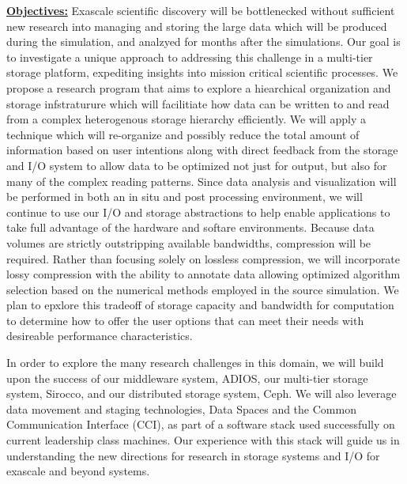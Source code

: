 \documentclass[11pt,letterpaper]{article}
\begin{document}
\underline{\textbf{Objectives:}} Exascale scientific discovery will
be bottlenecked 
without sufficient new research into managing and storing the large data which will be
produced during the simulation, and analzyed for months after the simulations.
Our goal is to investigate a unique approach to addressing this challenge in
a multi-tier storage platform, expediting insights into mission critical
scientific processes. 
%
We propose a research program that aims to explore a hiearchical
organization and storage infstraturure which will facilitiate how data can
be written to and read from a complex heterogenous storage hierarchy
efficiently.  
%
We will apply a technique which will re-organize and possibly
reduce the total amount of information based on user intentions along with
direct feedback from the storage and I/O system to allow data to be
optimized not just for output, but also for many of the complex reading
patterns. Since data analysis and visualization will be performed in both an
in situ and post processing environment, we will continue to use our I/O and
storage abstractions to help enable applications to take full advantage of
the hardware and softare environments. Because data volumes are strictly
outstripping available bandwidths, compression will be required. Rather than
focusing solely on lossless compression, we will incorporate lossy
compression with the ability to annotate data allowing optimized algorithm
selection based on the numerical methods employed in the source
simulation. We plan to epxlore this tradeoff of storage capacity and
bandwidth for computation to determine how to offer the user options that
can meet their needs with desireable performance characteristics.

In order to explore the many research challenges in this
domain, we will build upon the success of our middleware system, ADIOS, our
multi-tier storage system, Sirocco, and our distributed storage system,
Ceph.  We will also leverage data movement and staging technologies, Data
Spaces and the Common Communication Interface (CCI), as part of a software
stack used successfully on current leadership class machines. Our experience
with this stack will guide us in understanding the new directions for
research in storage systems and I/O for exascale and beyond systems.
\end{document}
